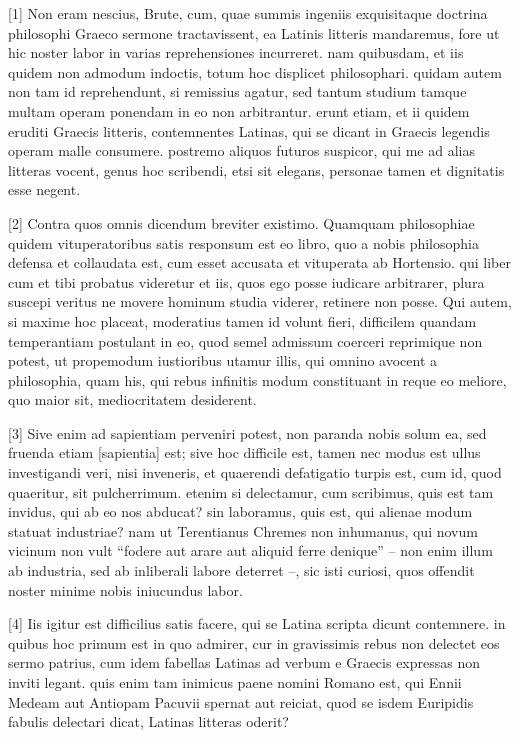 \documentclass{article}
\begin{document}
[1] Non eram nescius, Brute, cum, quae summis ingeniis exquisitaque doctrina philosophi Graeco sermone tractavissent, ea Latinis litteris mandaremus, fore ut hic noster labor in varias reprehensiones incurreret. nam quibusdam, et iis quidem non admodum indoctis, totum hoc displicet philosophari. quidam autem non tam id reprehendunt, si remissius agatur, sed tantum studium tamque multam operam ponendam in eo non arbitrantur. erunt etiam, et ii quidem eruditi Graecis litteris, contemnentes Latinas, qui se dicant in Graecis legendis operam malle consumere. postremo aliquos futuros suspicor, qui me ad alias litteras vocent, genus hoc scribendi, etsi sit elegans, personae tamen et dignitatis esse negent.

[2] Contra quos omnis dicendum breviter existimo. Quamquam philosophiae quidem vituperatoribus satis responsum est eo libro, quo a nobis philosophia defensa et collaudata est, cum esset accusata et vituperata ab Hortensio. qui liber cum et tibi probatus videretur et iis, quos ego posse iudicare arbitrarer, plura suscepi veritus ne movere hominum studia viderer, retinere non posse. Qui autem, si maxime hoc placeat, moderatius tamen id volunt fieri, difficilem quandam temperantiam postulant in eo, quod semel admissum coerceri reprimique non potest, ut propemodum iustioribus utamur illis, qui omnino avocent a philosophia, quam his, qui rebus infinitis modum constituant in reque eo meliore, quo maior sit, mediocritatem desiderent.

[3] Sive enim ad sapientiam perveniri potest, non paranda nobis solum ea, sed fruenda etiam [sapientia] est; sive hoc difficile est, tamen nec modus est ullus investigandi veri, nisi inveneris, et quaerendi defatigatio turpis est, cum id, quod quaeritur, sit pulcherrimum. etenim si delectamur, cum scribimus, quis est tam invidus, qui ab eo nos abducat? sin laboramus, quis est, qui alienae modum statuat industriae? nam ut Terentianus Chremes non inhumanus, qui novum vicinum non vult ``fodere aut arare aut aliquid ferre denique'' -- non enim illum ab industria, sed ab inliberali labore deterret --, sic isti curiosi, quos offendit noster minime nobis iniucundus labor.

[4] Iis igitur est difficilius satis facere, qui se Latina scripta dicunt contemnere. in quibus hoc primum est in quo admirer, cur in gravissimis rebus non delectet eos sermo patrius, cum idem fabellas Latinas ad verbum e Graecis expressas non inviti legant. quis enim tam inimicus paene nomini Romano est, qui Ennii Medeam aut Antiopam Pacuvii spernat aut reiciat, quod se isdem Euripidis fabulis delectari dicat, Latinas litteras oderit?
\end{document}
